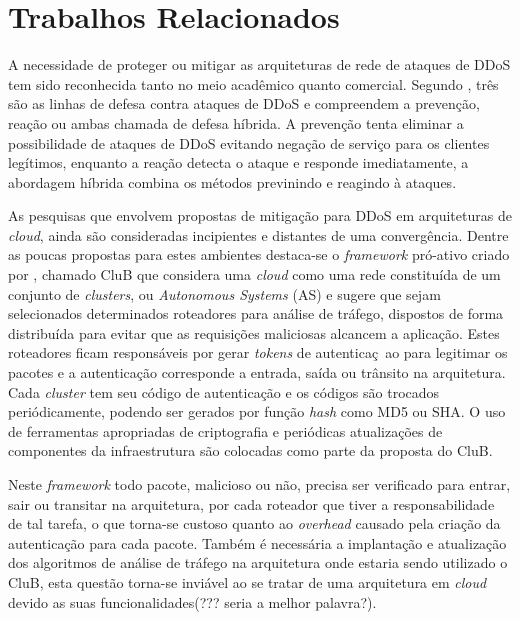 \documentclass[a4paper, 12pt]{article}
\begin{document}
\section{Trabalhos Relacionados}

A necessidade de proteger ou mitigar as arquiteturas de rede de ataques de DDoS tem sido reconhecida tanto no meio acadêmico quanto comercial. Segundo \cite{1039856}, três são as linhas de defesa contra ataques de DDoS e compreendem a prevenção, reação ou ambas chamada de defesa híbrida. A prevenção tenta eliminar a possibilidade de ataques de DDoS evitando negação de serviço para os clientes legítimos, enquanto a reação detecta o ataque e responde imediatamente, a abordagem híbrida combina os métodos previnindo e reagindo à ataques.

As pesquisas que envolvem propostas de mitigação para DDoS em arquiteturas de \emph{cloud}, ainda são consideradas incipientes e distantes de uma convergência. Dentre as poucas propostas para estes ambientes destaca-se o \emph{framework} pró-ativo criado por \cite{Hazelhurst:2008:SCU:1456659.1456671}, chamado CluB que considera uma \emph{cloud} como uma rede constituída de um conjunto de \emph{clusters}, ou \emph{Autonomous Systems} (AS) e sugere
que sejam selecionados determinados roteadores para análise de tráfego, dispostos de forma distribuída para evitar que as requisições maliciosas alcancem a aplicação. Estes roteadores ficam responsáveis por gerar \emph{tokens} de autenticaç~ao para legitimar os pacotes e a autenticação corresponde a entrada, saída ou trânsito na arquitetura. Cada \emph{cluster} tem seu código de autenticação e os códigos são trocados periódicamente, podendo ser gerados por função \emph{hash} como MD5 ou SHA. O uso de ferramentas apropriadas de criptografia e periódicas atualizações de componentes da infraestrutura são colocadas como parte da proposta do CluB.



Neste \emph{framework} todo pacote, malicioso ou não, precisa ser verificado para entrar, sair ou transitar na arquitetura, por cada roteador que tiver a responsabilidade de tal tarefa, o que torna-se custoso quanto ao \emph{overhead} causado pela criação da autenticação para cada pacote. Também é necessária a implantação e atualização dos algoritmos de análise de tráfego na arquitetura onde estaria sendo utilizado o CluB, esta questão torna-se inviável ao se tratar de uma arquitetura em \emph{cloud} devido as suas funcionalidades(??? seria a melhor palavra?). 
\end{document}
